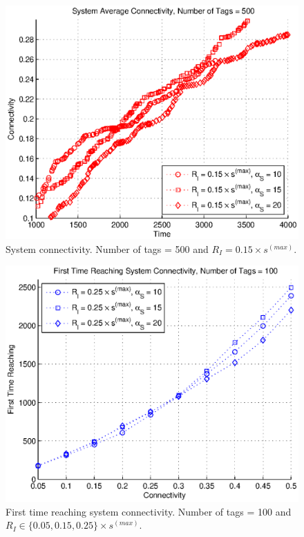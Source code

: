 \begin{figure}
\centering
\includegraphics[width=5in]{Chapter_4_Figures/sys_connect_500tags_15diam.eps}
\caption{System connectivity. Number of tags = 500 and $R_I = 0.15 \times s^{(max)}$.}
\label{Figure: sys_connect_500tags_15diam.eps}
\end{figure}
\begin{figure}
\centering
\includegraphics[width=5in]{Chapter_4_Figures/sys_first_time_connect_100tags.eps}
\caption{First time reaching system connectivity. Number of tags = 100 and $R_I \in \{0.05, 0.15, 0.25\} \times s^{(max)}$.}
\label{Figure: sys_first_time_connect_100tags.eps}
\end{figure}
\clearpage

